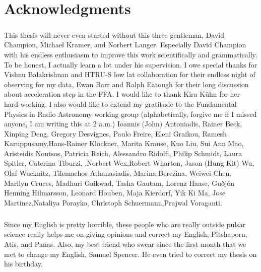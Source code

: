 \documentclass[../chapter1/thesis_msc.tex]{subfiles}
\begin{document}
    \chapter*{Acknowledgments}
    \thispagestyle{plain}

\paragraph{} This thesis will never even started without this three gentleman, David Champion, Michael Kramer, and Norbert Langer. Especially David Champion with his endless enthusiasm to improve this work scientifically and grammatically. To be honest, I actually learn a lot under his supervision. I owe special thanks for Vishnu Balakrishnan and HTRU-S low lat collaboration for their endless night of observing for my data, Ewan Barr and Ralph Eatough for their long discussion about acceleration step in the FFA. I would like to thank Kira Kühn for her hard-working. I also would like to extend my gratitude to the Fundamental Physics in Radio Astronomy working group (alphabetically, forgive me if I missed anyone, I am writing this at 2 a.m.) Ioannis (John) Antoniadis, Rainer Beck, Xinping Deng, Gregory Desvignes, Paulo Freire, Eleni Graikou, Ramesh Karuppusamy,Hans-Rainer Klöckner, Marita Krause, Kuo Liu, Sui Ann Mao, Aristeidis Noutsos, Patricia Reich, Alessandro Ridolfi, Philip Schmidt, Laura Spitler, Caterina Tiburzi, ,Norbert Wex,Robert Wharton, Jason (Hung Kit) Wu, Olaf Wucknitz, Tilemachos Athanasiadis, Marina Berezina, Weiwei Chen, Marilyn Cruces, Madhuri Gaikwad, Tasha Gautam, Lorenz Haase, Guðjón Henning Hilmarsson, Leonard Houben, Maja Kierdorf, Yik Ki Ma, Jose Martinez,Nataliya Porayko, Christoph Schuermann,Prajwal Voraganti. 

\paragraph{} Since my English is pretty horrible, these people who are really outside pulsar science really helps me on giving opinions and correct my English, Pitshaporn, Atis, and Panas. Also, my best friend who swear since the first month that we met to change my English, Samuel Spencer. He even tried to correct my thesis on his birthday.    
\end{document}
